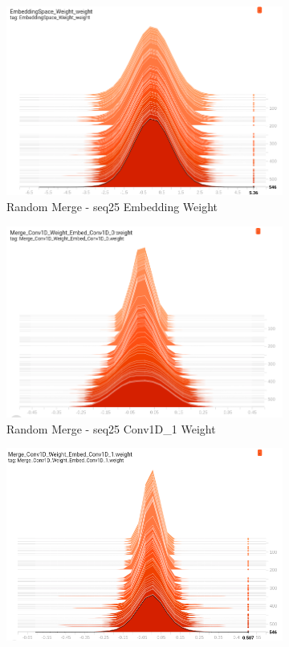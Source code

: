 \documentclass[12pt]{article}
\begin{document}
\begin{figure} [!h] 
\begin{subfigure}[h]{0.3\linewidth} 
\includegraphics[width=\linewidth]{figures/RandMerge_Seq25EmbeddingWeight.png}
\caption{Random Merge - seq25 Embedding Weight}
\end{subfigure}
\hfill
\begin{subfigure}[h]{0.3\linewidth} 
\includegraphics[width=\linewidth]{figures/RandMerge_seq25_conv1d_1.png}
\caption{Random Merge - seq25 Conv1D\_1 Weight}
\end{subfigure}
\hfill
\begin{subfigure}[h]{0.3\linewidth}
\includegraphics[width=\linewidth]{figures/RandMerg_seq25_conv1d_2.png}

\end{subfigure}
\end{figure}
\end{document}
